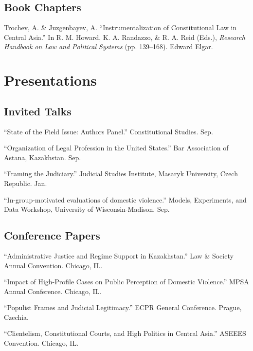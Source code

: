 \documentclass[11pt,letterpaper]{report}
\begin{document}
    \subsection*{Book Chapters}

    \begin{tablist}

        \item[2023] \tab{}Trochev, A. \& Juzgenbayev, A. \enquote{Instrumentalization of Constitutional Law in Central Asia.} In R. M. Howard, K. A. Randazzo, \& R. A. Reid (Eds.), \textit{Research Handbook on Law and Political Systems} (pp. 139--168). Edward Elgar.

    \end{tablist}


    \section*{Presentations}

    \subsection*{Invited Talks}

    \begin{tablist}
        \item[2025] \tab{}\enquote{State of the Field Issue: Authors Panel.} Constitutional Studies. Sep.
        \item[2025] \tab{}\enquote{Organization of Legal Profession in the United States.} Bar Association of Astana, Kazakhstan. Sep.
        \item[2025] \tab{}\enquote{Framing the Judiciary.} Judicial Studies Institute, Masaryk University, Czech Republic. Jan.
        \item[2024] \tab{}\enquote{In-group-motivated evaluations of domestic violence.} Models, Experiments, and Data Workshop, University of Wisconsin-Madison. Sep.
    \end{tablist}

    \subsection*{Conference Papers}

    \begin{tablist}
        \item[2025] \tab{}\enquote{Administrative Justice and Regime Support in Kazakhstan.} Law \& Society Annual Convention. Chicago, IL.
        \item[2025] \tab{}\enquote{Impact of High-Profile Cases on Public Perception of Domestic Violence.} MPSA Annual Conference. Chicago, IL.
        \item[2024] \tab{}\enquote{Populist Frames and Judicial Legitimacy.} ECPR General Conference. Prague, Czechia.
        \item[2022] \tab{}\enquote{Clientelism, Constitutional Courts, and High Politics in Central Asia.} ASEEES Convention. Chicago, IL.
    \end{tablist}
\end{document}
